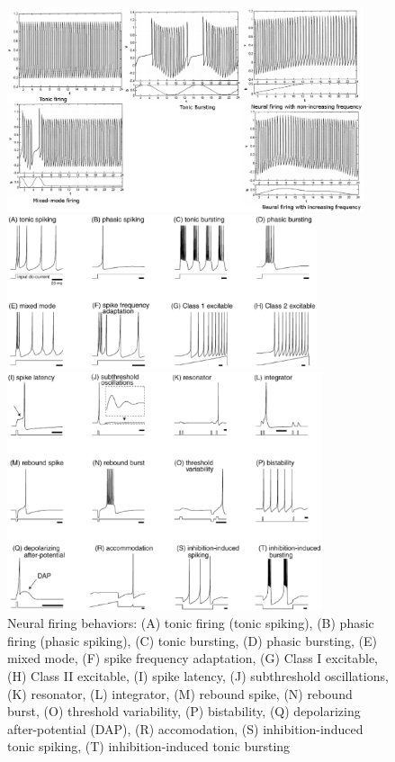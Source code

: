 \begin{figure}[htb]
  \centerline{\includegraphics[height=6cm]{./images/neural_firing_behaviors.eps}}
  \centerline{\includegraphics[height=4.5cm]{./images/neural_firing_behavior_1.eps}}
  \centerline{\includegraphics[height=7.0cm]{./images/neural_firing_behavior_2.eps}}
  \caption{Neural firing behaviors: (A) tonic firing (tonic spiking), (B) phasic
  firing (phasic spiking), (C) tonic bursting, (D) phasic bursting, (E) mixed
  mode, (F) spike frequency adaptation, (G) Class I excitable, (H) Class II
  excitable, (I) spike latency, (J) subthreshold oscillations, (K) resonator,
  (L) integrator, (M) rebound spike, (N) rebound burst, (O) threshold
  variability, (P) bistability, (Q) depolarizing after-potential (DAP), (R)
  accomodation, (S) inhibition-induced tonic spiking, (T) inhibition-induced
  tonic bursting}
  \label{fig:neural_firing_behavior}
\end{figure}

